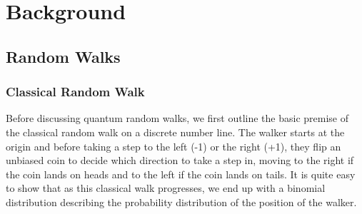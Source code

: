 \section{Background}
\subsection{Random Walks}
\subsubsection{Classical Random Walk}
Before discussing quantum random walks, we first outline the basic premise of the classical random walk on a discrete number line.
The walker starts at the origin and before taking a step to the left (-1) or the right (+1), they flip an unbiased coin to decide which direction to take a step in, moving to the right if the coin lands on heads and to the left if the coin lands on tails. 
It is quite easy to show that as this classical walk progresses, we end up with a binomial distribution describing the probability distribution of the position of the walker.

